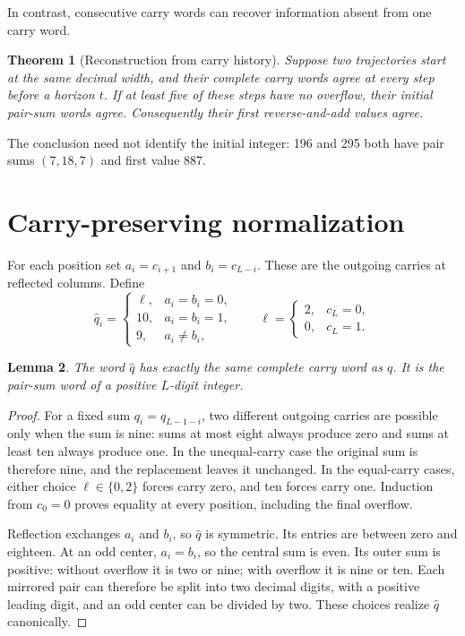 \documentclass[11pt]{article}
\newtheorem{theorem}{Theorem}
\newtheorem{lemma}[theorem]{Lemma}
\begin{document}
In contrast, consecutive carry words can recover information absent from
one carry word.
\begin{theorem}[Reconstruction from carry history]\label{thm:history}
Suppose two trajectories start at the same decimal width, and their complete
carry words agree at every step before a horizon $t$. If at least five of
these steps have no overflow, their initial pair-sum words agree. Consequently
their first reverse-and-add values agree.
\end{theorem}
The conclusion need not identify the initial integer: 196 and 295 both
have pair sums $(7,18,7)$ and first value 887.

\section{Carry-preserving normalization}
For each position set $a_i=c_{i+1}$ and $b_i=c_{L-i}$. These are the outgoing
carries at reflected columns. Define
\begin{equation}\label{eq:norm}
 \widehat q_i=\begin{cases}
 \ell,&a_i=b_i=0,\\
 10,&a_i=b_i=1,\\
 9,&a_i\ne b_i,
 \end{cases}
 \qquad
 \ell=\begin{cases}2,&c_L=0,\\0,&c_L=1.\end{cases}
\end{equation}

\begin{lemma}\label{lem:norm}
The word $\widehat q$ has exactly the same complete carry word as $q$.
It is the pair-sum word of a positive $L$-digit integer.
\end{lemma}
\begin{proof}
For a fixed sum $q_i=q_{L-1-i}$, two different outgoing carries are possible
only when the sum is nine: sums at most eight always produce zero and sums
at least ten always produce one. In the unequal-carry case the original
sum is therefore nine, and the replacement leaves it unchanged. In the
equal-carry cases, either choice $\ell\in\{0,2\}$ forces carry zero, and ten
forces carry one. Induction from $c_0=0$ proves equality at every position,
including the final overflow.

Reflection exchanges $a_i$ and $b_i$, so $\widehat q$ is symmetric. Its entries
are between zero and eighteen. At an odd center, $a_i=b_i$, so the central
sum is even. Its outer sum is positive: without overflow it is two or nine;
with overflow it is nine or ten. Each mirrored pair can therefore be split
into two decimal digits, with a positive leading digit, and an odd center
can be divided by two. These choices realize $\widehat q$ canonically.
\end{proof}
\end{document}
